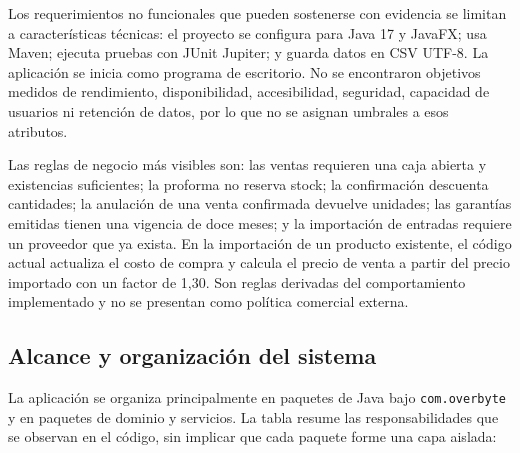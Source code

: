 Los requerimientos no funcionales que pueden sostenerse con evidencia se limitan a características técnicas: el proyecto se configura para Java 17 y JavaFX; usa Maven; ejecuta pruebas con JUnit Jupiter; y guarda datos en CSV UTF-8. La aplicación se inicia como programa de escritorio. No se encontraron objetivos medidos de rendimiento, disponibilidad, accesibilidad, seguridad, capacidad de usuarios ni retención de datos, por lo que no se asignan umbrales a esos atributos.

Las reglas de negocio más visibles son: las ventas requieren una caja abierta y existencias suficientes; la proforma no reserva stock; la confirmación descuenta cantidades; la anulación de una venta confirmada devuelve unidades; las garantías emitidas tienen una vigencia de doce meses; y la importación de entradas requiere un proveedor que ya exista. En la importación de un producto existente, el código actual actualiza el costo de compra y calcula el precio de venta a partir del precio importado con un factor de 1,30. Son reglas derivadas del comportamiento implementado y no se presentan como política comercial externa.

\subsection{Alcance y organización del sistema}
\label{subsec:organizacion}

La aplicación se organiza principalmente en paquetes de Java bajo \texttt{com.overbyte} y en paquetes de dominio y servicios. La tabla resume las responsabilidades que se observan en el código, sin implicar que cada paquete forme una capa aislada:

